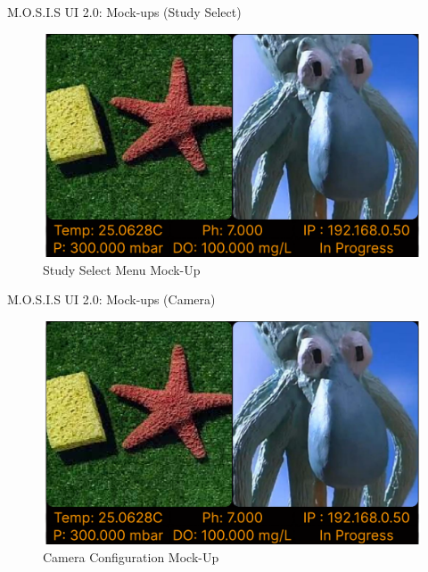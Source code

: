 \documentclass[17pt, aspectratio=169]{beamer}
\begin{document}
\begin{frame}{M.O.S.I.S UI 2.0: Mock-ups (Study Select)}
	\begin{figure}
		\includegraphics[page=2,height=0.65\textheight]{../../Progress_Report_Document/Appendix/Design_Documentation/User_Interface/Figures/M.O.S.I.S_UI_Design.pdf}
		\caption{Study Select Menu Mock-Up}
	\end{figure}
\end{frame}
\begin{frame}{M.O.S.I.S UI 2.0: Mock-ups (Camera)}
	\begin{figure}
		\includegraphics[page=3,height=0.65\textheight]{../../Progress_Report_Document/Appendix/Design_Documentation/User_Interface/Figures/M.O.S.I.S_UI_Design.pdf}
		\caption{Camera Configuration Mock-Up}
	\end{figure}
\end{frame}
\end{document}
